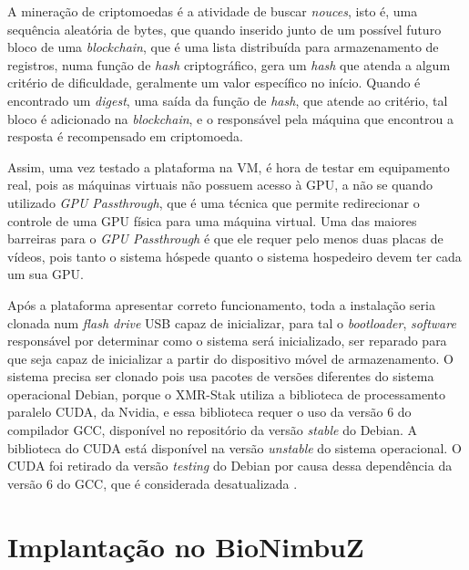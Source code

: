 A mineração de criptomoedas é a atividade de buscar \textit{nouces}, isto é, uma sequência aleatória de bytes, que quando inserido junto de um possível futuro bloco de uma \textit{blockchain}, que é uma lista distribuída para armazenamento de registros, numa função de \textit{hash} criptográfico, gera um \textit{hash} que atenda a algum critério de dificuldade, geralmente um valor específico no início. Quando é encontrado um \textit{digest}, uma saída da função de \textit{hash}, que atende ao critério, tal bloco é adicionado na \textit{blockchain}, e o responsável pela máquina que encontrou a resposta é recompensado em criptomoeda.

Assim, uma vez testado a plataforma na \acrshort{VM}, é hora de testar em equipamento real, pois as máquinas virtuais não possuem acesso à \acrshort{GPU}, a não se quando utilizado \textit{\acrshort{GPU} Passthrough}, que é uma técnica que permite redirecionar o controle de uma \acrshort{GPU} física para uma máquina virtual. Uma das maiores barreiras para o \textit{\acrshort{GPU} Passthrough} é que ele requer pelo menos duas placas de vídeos, pois tanto o sistema hóspede quanto o sistema hospedeiro devem ter cada um sua \acrshort{GPU}.


Após a plataforma apresentar correto funcionamento, toda a instalação seria clonada num \textit{flash drive} \acrshort{USB} capaz de inicializar, para tal o \textit{bootloader}, \textit{software} responsável por determinar como o sistema será inicializado, ser reparado para que seja capaz de inicializar a partir do dispositivo móvel de armazenamento. O sistema precisa ser clonado pois usa pacotes de versões diferentes do sistema operacional Debian\cite{Debian}, porque o XMR-Stak utiliza a biblioteca de processamento paralelo \acrshort{CUDA}\cite{CUDA}, da Nvidia\cite{NVIDIA}, e essa biblioteca requer o uso da versão 6 do compilador \acrshort{GCC}\cite{GCC}, disponível no repositório da versão \textit{stable} do Debian. A biblioteca do CUDA está disponível na versão \textit{unstable} do sistema operacional. O \acrshort{CUDA} foi retirado da versão \textit{testing} do Debian por causa dessa dependência da versão 6 do \acrshort{GCC}, que é considerada desatualizada \cite{CUDA_BUGREP}.


\section{Implantação no BioNimbuZ}

